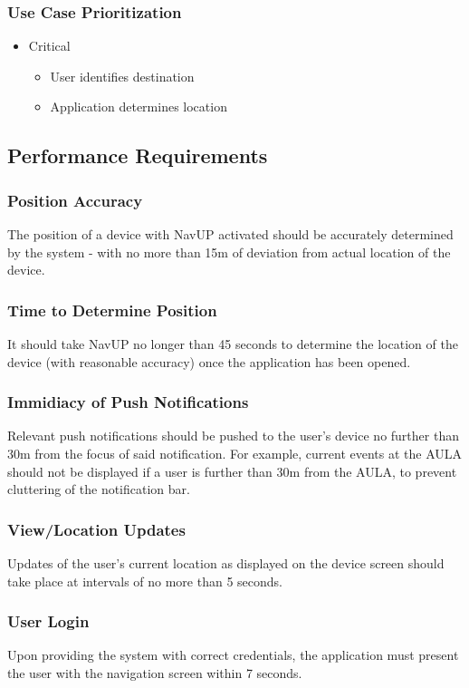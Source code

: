 \documentclass[12pt, a4paper]{article}
\begin{document}
		\subsubsection{Use Case Prioritization}
			\begin{itemize}
				\item Critical
				\begin{itemize}
					\item User identifies destination
					\item Application determines location
				\end{itemize}
			\end{itemize}
	\subsection{Performance Requirements}
		\subsubsection{Position Accuracy} The position of a device with NavUP activated should be accurately determined by the system - with no more than 15m of deviation from actual location of the device.
		\subsubsection{Time to Determine Position} It should take NavUP no longer than 45 seconds to determine the location of the device (with reasonable accuracy) once the application has been opened.
		\subsubsection{Immidiacy of Push Notifications} Relevant push notifications should be pushed to the user's device no further than 30m from the focus of said notification. For example, current events at the AULA should not be displayed if a user is further than 30m from the AULA, to prevent cluttering of the notification bar.
		\subsubsection{View/Location Updates} Updates of the user's current location as displayed on the device screen should take place at intervals of no more than 5 seconds.
		\subsubsection{User Login} Upon providing the system with correct credentials, the application must present the user with the navigation screen within 7 seconds. 
\end{document}
